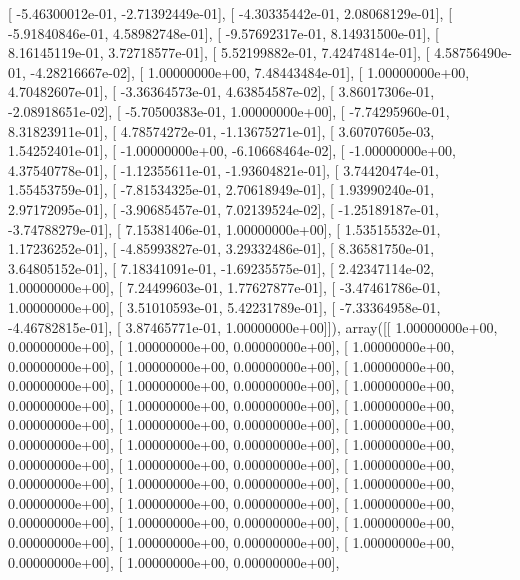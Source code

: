 \documentclass{article}
\begin{document}
       [ -5.46300012e-01,  -2.71392449e-01],
       [ -4.30335442e-01,   2.08068129e-01],
       [ -5.91840846e-01,   4.58982748e-01],
       [ -9.57692317e-01,   8.14931500e-01],
       [  8.16145119e-01,   3.72718577e-01],
       [  5.52199882e-01,   7.42474814e-01],
       [  4.58756490e-01,  -4.28216667e-02],
       [  1.00000000e+00,   7.48443484e-01],
       [  1.00000000e+00,   4.70482607e-01],
       [ -3.36364573e-01,   4.63854587e-02],
       [  3.86017306e-01,  -2.08918651e-02],
       [ -5.70500383e-01,   1.00000000e+00],
       [ -7.74295960e-01,   8.31823911e-01],
       [  4.78574272e-01,  -1.13675271e-01],
       [  3.60707605e-03,   1.54252401e-01],
       [ -1.00000000e+00,  -6.10668464e-02],
       [ -1.00000000e+00,   4.37540778e-01],
       [ -1.12355611e-01,  -1.93604821e-01],
       [  3.74420474e-01,   1.55453759e-01],
       [ -7.81534325e-01,   2.70618949e-01],
       [  1.93990240e-01,   2.97172095e-01],
       [ -3.90685457e-01,   7.02139524e-02],
       [ -1.25189187e-01,  -3.74788279e-01],
       [  7.15381406e-01,   1.00000000e+00],
       [  1.53515532e-01,   1.17236252e-01],
       [ -4.85993827e-01,   3.29332486e-01],
       [  8.36581750e-01,   3.64805152e-01],
       [  7.18341091e-01,  -1.69235575e-01],
       [  2.42347114e-02,   1.00000000e+00],
       [  7.24499603e-01,   1.77627877e-01],
       [ -3.47461786e-01,   1.00000000e+00],
       [  3.51010593e-01,   5.42231789e-01],
       [ -7.33364958e-01,  -4.46782815e-01],
       [  3.87465771e-01,   1.00000000e+00]]), array([[  1.00000000e+00,   0.00000000e+00],
       [  1.00000000e+00,   0.00000000e+00],
       [  1.00000000e+00,   0.00000000e+00],
       [  1.00000000e+00,   0.00000000e+00],
       [  1.00000000e+00,   0.00000000e+00],
       [  1.00000000e+00,   0.00000000e+00],
       [  1.00000000e+00,   0.00000000e+00],
       [  1.00000000e+00,   0.00000000e+00],
       [  1.00000000e+00,   0.00000000e+00],
       [  1.00000000e+00,   0.00000000e+00],
       [  1.00000000e+00,   0.00000000e+00],
       [  1.00000000e+00,   0.00000000e+00],
       [  1.00000000e+00,   0.00000000e+00],
       [  1.00000000e+00,   0.00000000e+00],
       [  1.00000000e+00,   0.00000000e+00],
       [  1.00000000e+00,   0.00000000e+00],
       [  1.00000000e+00,   0.00000000e+00],
       [  1.00000000e+00,   0.00000000e+00],
       [  1.00000000e+00,   0.00000000e+00],
       [  1.00000000e+00,   0.00000000e+00],
       [  1.00000000e+00,   0.00000000e+00],
       [  1.00000000e+00,   0.00000000e+00],
       [  1.00000000e+00,   0.00000000e+00],
       [  1.00000000e+00,   0.00000000e+00],
\end{document}
